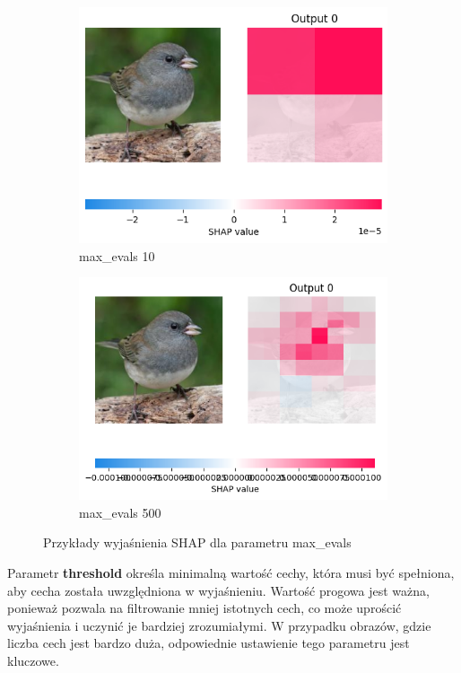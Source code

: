 \begin{figure}
	\centering
	\begin{subfigure}[b]{0.45\textwidth}
		\includegraphics[width=.9\textwidth]{img/parameters/shap/max_evals_10}
		\caption{max\_evals 10}  \label{rys:parameters_lime_numsamples_5}
	\end{subfigure}
	\begin{subfigure}[b]{0.45\textwidth}
		\centering\includegraphics[width=.9\textwidth]{img/parameters/shap/max_evals_500}
		\caption{max\_evals 500}  \label{rys:parameters_lime_numsamples_1000}
	\end{subfigure}
	\caption{Przykłady wyjaśnienia SHAP dla parametru max\_evals}
\end{figure}
Parametr \textbf{threshold} określa minimalną wartość cechy, która musi być spełniona, aby cecha została uwzględniona w wyjaśnieniu.
Wartość progowa jest ważna, ponieważ pozwala na filtrowanie mniej istotnych cech, co może uprościć wyjaśnienia i uczynić je bardziej zrozumiałymi.
W przypadku obrazów, gdzie liczba cech jest bardzo duża, odpowiednie ustawienie tego parametru jest kluczowe.

